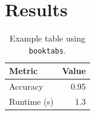\chapter{Results}
\begin{table}[htbp]
\centering
\begin{tabular}{lr}
\toprule
Metric & Value \\
\midrule
Accuracy & 0.95 \\
Runtime (s) & 1.3 \\
\bottomrule
\end{tabular}
\caption{Example table using \texttt{booktabs}.}
\end{table}
